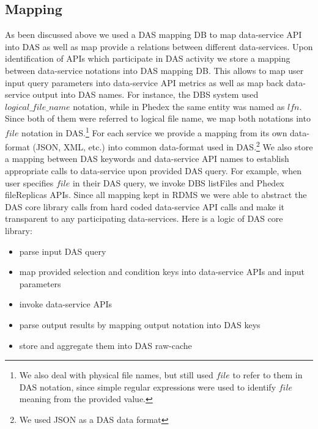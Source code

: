 \documentclass[a4paper]{jpconf}
\begin{document}
\subsection{Mapping}
As been discussed above we used a DAS mapping DB to map data-service API into
DAS as well as map provide a relations between different data-services.
Upon identification of APIs which participate in DAS activity 
we store a mapping between data-service notations
into DAS mapping DB. This allows to map user input query parameters into
data-service API metrics as well as map back data-service output into DAS names.
For instance, the DBS system used $logical\_file\_name$ notation, while in Phedex
the same entity was named as $lfn$. Since both of them were referred to
logical file name, we map both notations into $file$ notation in DAS.\footnote{We
also deal with physical file names, but still used $file$ to refer to them in
DAS notation, since simple regular expressions were used to identify $file$
meaning from the provided value.}
For each service we provide a mapping from its own data-format (JSON, XML, etc.) into
common data-format used in DAS.\footnote{We used JSON as a DAS data format}
We also store a mapping between DAS keywords and data-service API names to
establish appropriate calls to data-service upon provided DAS query. For example,
when user specifies $file$ in their DAS query, we invoke DBS listFiles and Phedex
fileReplicas APIs. Since all mapping kept in RDMS we were able to abstract the 
DAS core library calls from hard coded data-service API calls and make it
transparent to any participating data-services. Here is a logic of DAS core
library:
\begin{itemize}
\item parse input DAS query
\item map provided selection and condition keys into data-service APIs and
input parameters
\item invoke data-service APIs
\item parse output results by mapping output notation into DAS keys
\item store and aggregate them into DAS raw-cache
\end{itemize} 
\end{document}
